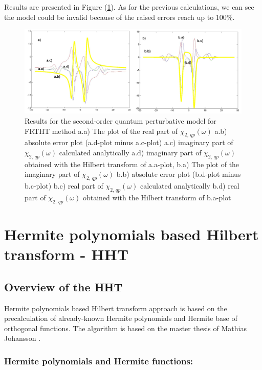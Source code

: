 \documentclass[12pt,twoside,a4paper]{article}
\numberwithin{equation}{subsection}
\numberwithin{figure}{subsection}
\begin{document}
Results are presented in Figure (\ref{fig:fht_qp2}). As for the previous calculations, we can see the model could be invalid
because of the raised errors reach up to $ 100 \% $.

\begin{figure} 
  \includegraphics[width=150mm]{img/fht_qp2.png}
  \caption{Results for the second-order quantum perturbative model for FRTHT method
     a.a) The plot of the real part of $\chi_{2, \, qp}(\omega )$
     a.b) absolute error plot (a.d-plot minus a.c-plot) 
     a.c) imaginary part of $\chi_{2, \, qp}(\omega )$ calculated analytically 
     a.d) imaginary part of $\chi_{2, \, qp}(\omega )$ obtained with the Hilbert transform of a.a-plot, 
     b.a) The plot of the imaginary part of $\chi_{2, \, qp}(\omega )$ 
     b.b) absolute error plot (b.d-plot minus b.c-plot) 
     b.c) real part of $\chi_{2, \, qp} (\omega )$ calculated analytically 
     b.d) real part of $\chi_{2, \, qp} (\omega )$ obtained with the Hilbert transform of b.a-plot 
     \label{fig:fht_qp2}
     }
\end{figure}

\section{Hermite polynomials based Hilbert transform - HHT} \label{chap:hermite}

\subsection{Overview of the HHT}  \label{chap:hermite_overview}

Hermite polynomials based Hilbert transform approach is based on the precalculation of already-known Hermite polynomials and Hermite base of
orthogonal functions. The algorithm is based on the master thesis of Mathias Johansson \cite{johansson_hilbert}.

\subsubsection*{Hermite polynomials and Hermite functions:}
\end{document}
